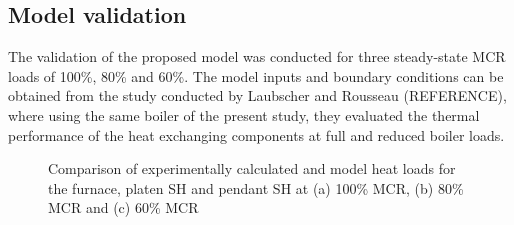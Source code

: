 \documentclass[review]{elsarticle}
\begin{document}
\subsection{Model validation}

The validation of the proposed model was conducted for three steady-state MCR loads of 100\%, 80\% and 60\%. The model inputs and boundary conditions can be obtained from the study conducted by Laubscher and Rousseau (REFERENCE), where using the same boiler of the present study, they evaluated the thermal performance of the heat exchanging components at full and reduced boiler loads.

\begin{figure}[h!]
\caption{Comparison of experimentally calculated and model heat loads for the furnace, platen SH and pendant SH at (a) 100\% MCR, (b) 80\% MCR and (c) 60\% MCR}
\label{fig_heat_valid}
\end{figure}
\end{document}
